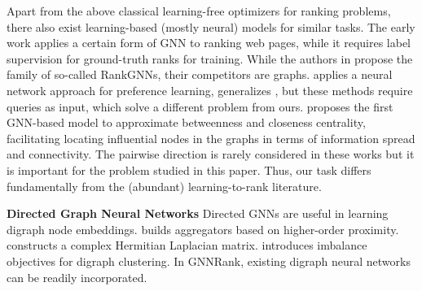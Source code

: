 \documentclass[nohyperref]{article}
\theoremstyle{plain}
\theoremstyle{definition}
\theoremstyle{remark}
\begin{document}
Apart from the above classical learning-free optimizers for ranking problems, there also exist learning-based (mostly neural) models for similar tasks. The early work \cite{scarselli2005graph} applies a certain form of GNN to ranking web pages, while it requires label supervision for ground-truth ranks for training. While the authors in \cite{damke2021ranking} propose the family of so-called RankGNNs, their competitors are graphs. 
\cite{rigutini2011sortnet} applies a neural network approach for preference learning, 
\cite{koppel2019pairwise} generalizes 
\cite{burges2005learning}, but these methods require queries as input, which solve a different problem from ours.
\cite{maurya2021graph} proposes the first GNN-based model to approximate betweenness and closeness centrality, facilitating locating influential nodes in the graphs in terms of information spread and connectivity. The pairwise direction is rarely considered in these works but it
is important for the problem studied in this paper. Thus, 
our task differs fundamentally
from the (abundant) learning-to-rank literature.

\textbf{Directed Graph Neural Networks}
Directed GNNs are useful in learning digraph node embeddings. 
\cite{tong2020digraph} builds aggregators based on higher-order proximity.
\cite{zhang2021magnet} constructs a complex Hermitian Laplacian matrix. 
\cite{he2021digrac} introduces imbalance objectives for digraph clustering. In GNNRank, existing digraph neural networks can be readily incorporated.
\end{document}

